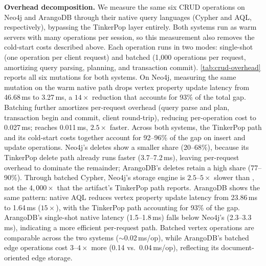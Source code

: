 \textbf{Overhead decomposition.}
We measure the same six CRUD operations on Neo4j and ArangoDB through their native query languages (Cypher and AQL, respectively), bypassing the TinkerPop layer entirely.
Both systems run as warm servers with many operations per session, so this measurement also removes the cold-start costs described above.
Each operation runs in two modes: single-shot (one operation per client request) and batched (1{,}000 operations per request, amortizing query parsing, planning, and transaction commit).
\autoref{tab:crud-overhead} reports all six mutations for both systems.
On Neo4j, measuring the same mutation on the warm native path drops vertex property update latency from 46.68\,ms to 3.27\,ms, a $14\times$ reduction that accounts for 93\% of the total gap.
Batching further amortizes per-request overhead (query parse and plan, transaction begin and commit, client round-trip), reducing per-operation cost to 0.027\,ms; \project{} reaches 0.011\,ms, $2.5\times$ faster.
Across both systems, the TinkerPop path and its cold-start costs together account for 92--96\% of the gap on insert and update operations.
Neo4j's deletes show a smaller share (20--68\%), because its TinkerPop delete path already runs faster (3.7--7.2\,ms), leaving per-request overhead to dominate the remainder; ArangoDB's deletes retain a high share (77--90\%).
Through batched Cypher, Neo4j's storage engine is $2.5$--$5\times$ slower than \project{}, not the $4{,}000\times$ that the artifact's TinkerPop path reports.
ArangoDB shows the same pattern: native AQL reduces vertex property update latency from 23.86\,ms to 1.64\,ms ($15\times$), with the TinkerPop path accounting for 93\% of the gap.
ArangoDB's single-shot native latency (1.5--1.8\,ms) falls below Neo4j's (2.3--3.3\,ms), indicating a more efficient per-request path.
Batched vertex operations are comparable across the two systems (${\sim}$0.02\,ms/op), while ArangoDB's batched edge operations cost $3$--$4\times$ more (0.14 vs.\ 0.04\,ms/op), reflecting its document-oriented edge storage.

